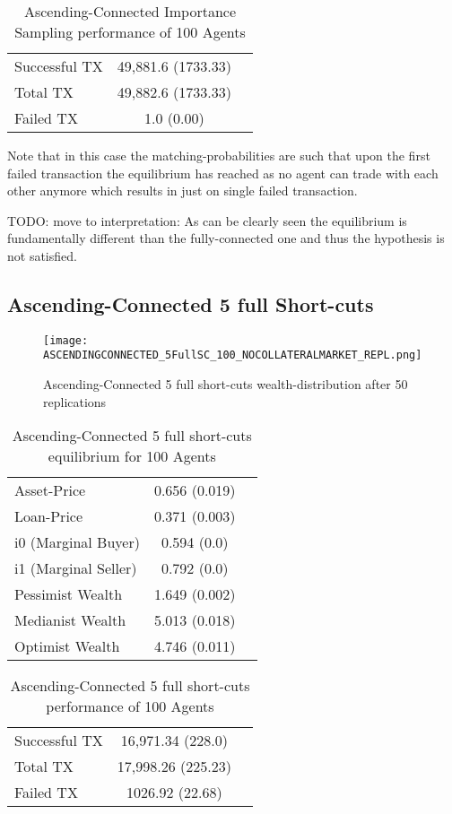 \documentclass[Bachelorarbeit.tex]{subfiles}
\begin{document}
\begin{table}[h]
	\caption{Ascending-Connected Importance Sampling performance of 100 Agents}
	\centering
	\begin{tabular} { l c r }
		\hline
		Successful TX & 49,881.6 (1733.33) \\
		Total TX & 49,882.6 (1733.33) \\
		Failed TX & 1.0 (0.00) \\
		\hline
	\end{tabular}
\end{table}

Note that in this case the matching-probabilities are such that upon the first failed transaction the equilibrium has reached as no agent can trade with each other anymore which results in just on single failed transaction.

TODO: move to interpretation: As can be clearly seen the equilibrium is fundamentally different than the fully-connected one and thus the hypothesis is not satisfied.

\subsection{Ascending-Connected 5 full Short-cuts }
\begin{figure}[!htbp]
	\centering
  \texttt{[image: ASCENDINGCONNECTED\_5FullSC\_100\_NOCOLLATERALMARKET\_REPL.png]}
	\caption{Ascending-Connected 5 full short-cuts wealth-distribution after 50 replications}
	\label{fig1}
\end{figure}

\begin{table}[h]
	\caption{Ascending-Connected 5 full short-cuts equilibrium for 100 Agents}
	\centering
	\begin{tabular} { l c r }
		\hline
		Asset-Price & 0.656 (0.019) \\
		Loan-Price & 0.371 (0.003) \\
		i0 (Marginal Buyer) & 0.594 (0.0) \\
		i1 (Marginal Seller) & 0.792 (0.0) \\
		Pessimist Wealth & 1.649 (0.002) \\
		Medianist Wealth & 5.013 (0.018) \\
		Optimist Wealth & 4.746 (0.011) \\
		\hline
	\end{tabular}
\end{table} 

\begin{table}[h]
	\caption{Ascending-Connected 5 full short-cuts performance of 100 Agents}
	\centering
	\begin{tabular} { l c r }
		\hline
		Successful TX & 16,971.34 (228.0) \\
		Total TX & 17,998.26 (225.23) \\
		Failed TX & 1026.92 (22.68) \\
		\hline
	\end{tabular}
\end{table}
\end{document}
